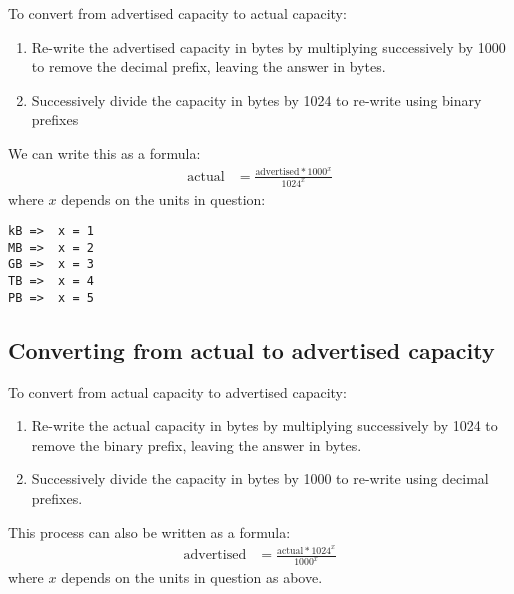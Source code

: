 \documentclass[slides]{pgnotes}
\begin{document}
To convert from advertised capacity to actual capacity:

\begin{enumerate}
\item
  Re-write the advertised capacity in bytes by multiplying successively
  by 1000 to remove the decimal prefix, leaving the answer in bytes.
\item
  Successively divide the capacity in bytes by 1024 to re-write using
  binary prefixes
\end{enumerate}

We can write this as a formula:
\begin{align}
  \mbox{actual} & = \frac{ \mbox{advertised} * 1000^x }{ 1024^x } \label{eq:advertised-to-actual-capacity}
\end{align}
where $x$ depends on the units in question:
\begin{verbatim}
kB =>  x = 1
MB =>  x = 2
GB =>  x = 3
TB =>  x = 4
PB =>  x = 5
\end{verbatim}

\subsection{Converting from actual to advertised capacity}
\label{sec:converting-from-actual-to-advertised-capacity}

To convert from actual capacity to advertised capacity:
\begin{enumerate}
\item
  Re-write the actual capacity in bytes by multiplying successively by
  1024 to remove the binary prefix, leaving the answer in bytes.
\item
  Successively divide the capacity in bytes by 1000 to re-write using
  decimal prefixes.
\end{enumerate}

This process can also be written as a formula:
\begin{align}
  \mbox{advertised} & = \frac{\mbox{actual} * 1024^x}{1000^x} 
\end{align}
where $x$ depends on the units in question as above.
\end{document}
